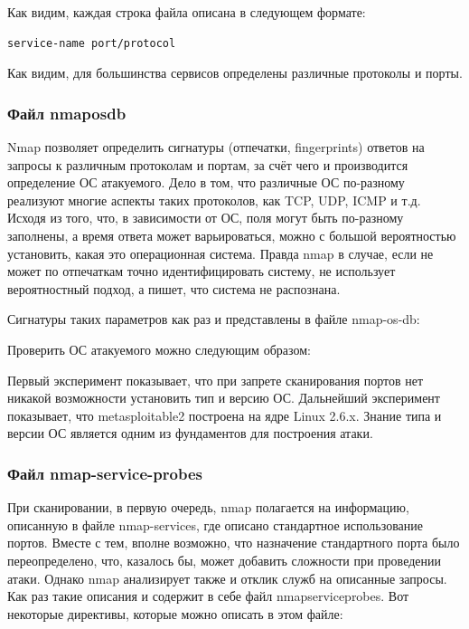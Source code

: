 \documentclass[a4paper]{article}
\begin{document}


Как видим, каждая строка файла описана в следующем формате:

\begin{lstlisting}
service-name port/protocol
\end{lstlisting}

Как видим, для большинства сервисов определены различные протоколы и порты. 

\subsubsection{Файл nmap\-os\-db}

Nmap позволяет определить сигнатуры (отпечатки, fingerprints) ответов на запросы к различным протоколам и портам, за счёт чего и производится определение ОС атакуемого. Дело в том, что различные ОС по-разному реализуют многие аспекты таких протоколов, как TCP, UDP, ICMP и т.д. Исходя из того, что, в зависимости от ОС, поля могут быть по-разному заполнены, а время ответа может варьироваться, можно с большой вероятностью установить, какая это операционная система. Правда nmap в случае, если не может по отпечаткам точно идентифицировать систему, не использует вероятностный подход, а пишет, что система не распознана.

Сигнатуры таких параметров как раз и представлены в файле nmap-os-db:



Проверить ОС атакуемого можно следующим образом:



Первый эксперимент показывает, что при запрете сканирования портов нет никакой возможности установить тип и версию ОС. Дальнейший эксперимент показывает, что metasploitable2 построена на ядре Linux 2.6.x. Знание типа и версии ОС является одним из фундаментов для построения атаки.

\subsubsection{Файл nmap-service-probes}

При сканировании, в первую очередь, nmap полагается на информацию, описанную в файле nmap-services, где описано стандартное использование портов. Вместе с тем, вполне возможно, что назначение стандартного порта было переопределено, что, казалось бы, может добавить сложности при проведении атаки. Однако nmap анализирует также и отклик служб на описанные запросы. Как раз такие описания и содержит в себе файл nmap\-service\-probes. Вот некоторые директивы, которые можно описать в этом файле:
\end{document}
